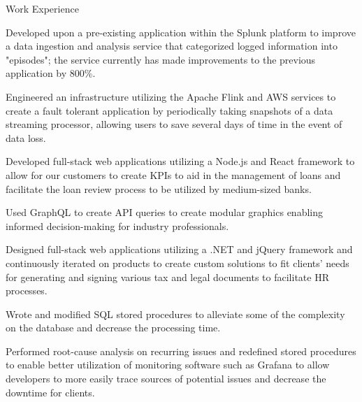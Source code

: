 \documentclass{resume} %
\begin{document}
\begin{workSection}{Work Experience}
    \experienceItem[
        company=Splunk,
        location=San Jose{,} CA,
        position=Backend Software Engineer Intern,
        duration=May 2023 – July 2023
    ]
     \begin{bullets}
        \item Developed upon a pre-existing application within the Splunk platform to improve a data ingestion and analysis service that categorized logged information into "episodes"; the service currently has made improvements to the previous application by 800\%.
        \item Engineered an infrastructure utilizing the Apache Flink and AWS services to create a fault tolerant application by periodically taking snapshots of a data streaming processor, allowing users to save several days of time in the event of data loss.
     \end{bullets}
     
    \experienceItem[
        company=QwickRate,
        location=Marietta{,} GA (Remote),
        position=Software Engineer Intern,
        duration=August 2022 – April 2023
    ]
    \begin{bullets}
        \item Developed full-stack web applications utilizing a Node.js and React framework to allow for our customers to create KPIs to aid in the management of loans and facilitate the loan review process to be utilized by medium-sized banks.
        \item Used GraphQL to create API queries to create modular graphics enabling informed decision-making for industry professionals.
     \end{bullets}

     \experienceItem[
        company=Ultimate Kronos Group (UKG),
        location=Atlanta{,} GA,
        position=Full-stack Software Engineer Intern,
        duration=January 2022 - August 2022,
     ]
     \begin{bullets}
        \item Designed full-stack web applications utilizing a .NET and jQuery framework and continuously iterated on products to create custom solutions to fit clients’ needs for generating and signing various tax and legal documents to facilitate HR processes.
        \item Wrote and modified SQL stored procedures to alleviate some of the complexity on the database and decrease the processing time.
        \item Performed root-cause analysis on recurring issues and redefined stored procedures to enable better utilization of monitoring software such as Grafana to allow developers to more easily trace sources of potential issues and decrease the downtime for clients.
     \end{bullets}
     
\end{workSection}
\end{document}
